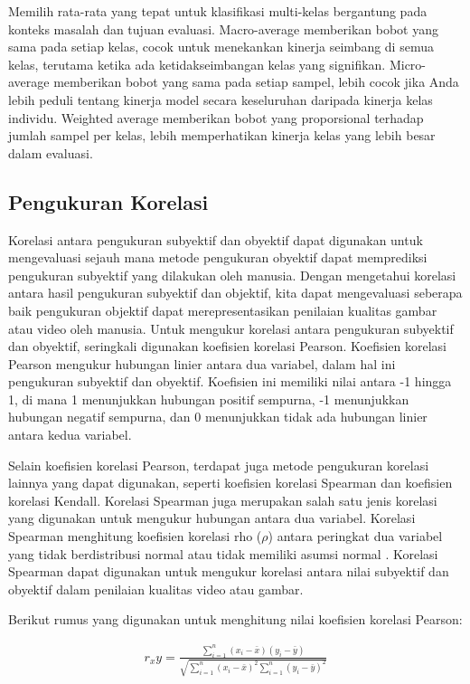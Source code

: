 Memilih rata-rata yang tepat untuk klasifikasi multi-kelas bergantung pada konteks masalah dan tujuan evaluasi. Macro-average memberikan bobot yang sama pada setiap kelas, cocok untuk menekankan kinerja seimbang di semua kelas, terutama ketika ada ketidakseimbangan kelas yang signifikan. Micro-average memberikan bobot yang sama pada setiap sampel, lebih cocok jika Anda lebih peduli tentang kinerja model secara keseluruhan daripada kinerja kelas individu. Weighted average memberikan bobot yang proporsional terhadap jumlah sampel per kelas, lebih memperhatikan kinerja kelas yang lebih besar dalam evaluasi.

\subsection{Pengukuran Korelasi}
\hspace{1.2cm}
Korelasi antara pengukuran subyektif dan obyektif dapat digunakan untuk mengevaluasi sejauh mana metode pengukuran obyektif dapat memprediksi pengukuran subyektif yang dilakukan oleh manusia. Dengan mengetahui korelasi antara hasil pengukuran subyektif dan objektif, kita dapat mengevaluasi seberapa baik pengukuran objektif dapat merepresentasikan penilaian kualitas gambar atau video oleh manusia. Untuk mengukur korelasi antara pengukuran subyektif dan obyektif, seringkali digunakan koefisien korelasi Pearson. Koefisien korelasi Pearson mengukur hubungan linier antara dua variabel, dalam hal ini pengukuran subyektif dan obyektif. Koefisien ini memiliki nilai antara -1 hingga 1, di mana 1 menunjukkan hubungan positif sempurna, -1 menunjukkan hubungan negatif sempurna, dan 0 menunjukkan tidak ada hubungan linier antara kedua variabel. 

Selain koefisien korelasi Pearson, terdapat juga metode pengukuran korelasi lainnya yang dapat digunakan, seperti koefisien korelasi Spearman dan koefisien korelasi Kendall. Korelasi Spearman juga merupakan salah satu jenis korelasi yang digunakan untuk mengukur hubungan antara dua variabel. Korelasi Spearman menghitung koefisien korelasi rho ($\rho$) antara peringkat dua variabel yang tidak berdistribusi normal atau tidak memiliki asumsi normal \citep{Pinson2004}. Korelasi Spearman dapat digunakan untuk mengukur korelasi antara nilai subyektif dan obyektif dalam penilaian kualitas video atau gambar. 

Berikut rumus yang digunakan untuk menghitung nilai koefisien korelasi Pearson:

\begin{equation}
	\begin{aligned}
		r _xy= \frac{\sum_{i=1}^n (x_i - \bar{x})(y_i - \bar{y})}{\sqrt{\sum_{i=1}^n (x_i-\bar{x})^2 \sum_{i=1}^n (y_i - \bar{y})^2}}
	\end{aligned}
\end{equation}

